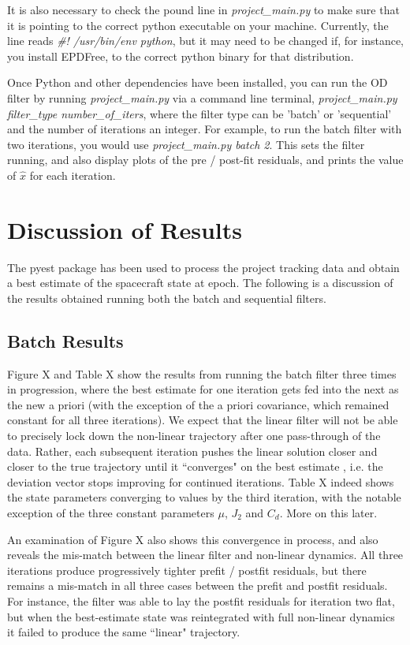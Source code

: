 \documentclass[10pt]{article}
\begin{document}
It is also necessary to check the pound line in \emph{project\_main.py} to make sure that it is pointing to the correct python executable on your machine. Currently, the line reads \emph{\#! /usr/bin/env python}, but it may need to be changed if, for instance, you install EPDFree, to the correct python binary for that distribution.

Once Python and other dependencies have been installed, you can run the OD filter by running \emph{project\_main.py} via a command line terminal, \emph{project\_main.py filter\_type number\_of\_iters}, where the filter type can be 'batch' or 'sequential' and the number of iterations an integer. For example, to run the batch filter with two iterations, you would use  \emph{project\_main.py batch 2}. This sets the filter running,  and also display plots of the pre / post-fit residuals, and prints the value of $\hat{x}$ for each iteration.

\section{Discussion of Results}

The pyest package has been used to process the project tracking data and obtain a best estimate of the spacecraft state at epoch. The following is a discussion of the results obtained running both the batch and sequential filters.

\subsection{Batch Results}

Figure X and Table X show the results from running the batch filter three times in progression, where the best estimate for one iteration gets fed into the next as the new a priori (with the exception of the a priori covariance, which remained constant for all three iterations). We expect that the linear filter will not be able to precisely lock down the non-linear trajectory after one pass-through of the data. Rather, each subsequent iteration pushes the linear solution closer and closer to the true trajectory until it ``converges" on the best estimate , i.e. the deviation vector stops improving for continued iterations. Table X indeed shows the state parameters converging to values by the third iteration, with the notable exception of the three constant parameters $\mu$, $J_2$ and $C_d$. More on this later. 

An examination of Figure X also shows this convergence in process, and also reveals the mis-match between the linear filter and non-linear dynamics. All three iterations produce progressively tighter prefit / postfit residuals, but there remains a mis-match in all three cases between the prefit and postfit residuals. For instance, the filter was able to lay the postfit residuals for iteration two flat, but when the best-estimate state was reintegrated with full non-linear dynamics it failed to produce the same ``linear" trajectory. 
\end{document}
